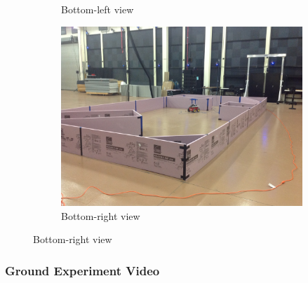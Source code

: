 \documentclass[11pt,professionalfonts,hyperref={pdftex,pdfpagemode=none,pdfstartview=FitH}]{beamer}
\begin{document}
\begin{frame}
\begin{figure}
\begin{subfigure}[b]{0.28\textwidth}
        		\caption*{Bottom-left view}
    	\end{subfigure}
	\hspace*{0.03\textwidth}
	\begin{subfigure}[b]{0.28\textwidth}
        		\includegraphics[width=\textwidth]{test_setup_2.jpg}
        		\caption*{Bottom-right view}
    	\end{subfigure}
\end{figure}

\end{frame}


\begin{frame}
\frametitle{Ground Experiment Video}




\end{frame}
\end{document}

